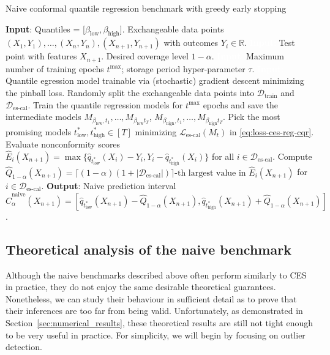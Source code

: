 \begin{algorithm}[H]
    \color{blue}
    \caption{Naive conformal quantile regression benchmark with greedy early stopping}
    \label{alg:naive-reg-cqr}
    \begin{algorithmic}[1]
        \STATE \textbf{Input}: Quantiles = [$\beta_{\text{low}}, \beta_{\text{high}}$]. Exchangeable data points $(X_{1},Y_{1}), \ldots, (X_{n},Y_{n}), (X_{n+1},Y_{n+1})$ with outcomes $Y_i \in \mathbb{R}$.
        \STATE \textcolor{white}{\textbf{Input}:} Test point with features $X_{n+1}$. Desired coverage level $1-\alpha$.
        \STATE \textcolor{white}{\textbf{Input}:} Maximum number of training epochs $t^{\max}$; storage period hyper-parameter $\tau$.
        \STATE \textcolor{white}{\textbf{Input}:} Quantile egression model trainable via (stochastic) gradient descent minimizing the pinball loss.
        \STATE Randomly split the exchangeable data points into $\mathcal{D}_{\text{train}}$ and $\mathcal{D}_{\text{es-cal}}$.
        \STATE Train the quantile regression models for $t^{\text{max}}$ epochs and save the intermediate models $M_{\beta_{\text{low}},t_1} , \dots, M_{\beta_{\text{low}}t_T}$,  $M_{\beta_{\text{high}},t_1} , \dots, M_{\beta_{\text{high}}t_T}$.
        \STATE Pick the most promising models $t^*_{\text{low}}, t^*_{\text{high}}\in [T]$ minimizing $\mathcal{L}_{\text{es-cal}}(M_t)$ in \eqref{eq:loss-ces-reg-cqr}.
        \STATE Evaluate nonconformity scores $\hat{E}_i(X_{n+1}) = \max\{\hat{q}_{t^*_{\text{low}}}(X_i) - Y_i, Y_i -\hat{q}_{t^*_{\text{high}}}(X_i)\}$ for all $i \in \mathcal{D}_{\text{es-cal}}$.
        \STATE Compute $\hat{Q}_{1-\alpha}(X_{n+1}) = \lceil (1-\alpha)(1+|\mathcal{D}_{\text{es-cal}}|) \rceil\text{-th largest value in }
        \hat{E}_i(X_{n+1})$ for $i \in \mathcal{D}_{\text{es-cal}}$.
        \STATE \textbf{Output}: Naive prediction interval $\hat{C}^{\text{naive}}_{\alpha}(X_{n+1}) = [\hat{q}_{t^*_{\text{low}}}(X_{n+1}) - \hat{Q}_{1-\alpha}(X_{n+1}), \hat{q}_{t^*_{\text{high}}}(X_{n+1}) + \hat{Q}_{1-\alpha}(X_{n+1})]$.
    \end{algorithmic}
\end{algorithm}


\subsection{Theoretical analysis of the naive benchmark} \label{app:naive-analysis}

Although the naive benchmarks described above often perform similarly to CES in practice, they do not enjoy the same desirable theoretical guarantees.
Nonetheless, we can study their behaviour in sufficient detail as to prove that their inferences are too far from being valid.
Unfortunately, as demonstrated in Section~\ref{sec:numerical_results}, these theoretical results are still not tight enough to be very useful in practice.
For simplicity, we will begin by focusing on outlier detection.



